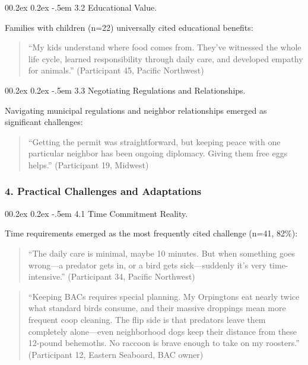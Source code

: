 \documentclass[
  man,
  floatsintext,
  longtable,
  nolmodern,
  notxfonts,
  notimes,
  colorlinks=true,linkcolor=blue,citecolor=blue,urlcolor=blue]{apa7}
\makeatletter
\renewcommand{\paragraph}{\@startsection{paragraph}{4}{\parindent}%
	{0\baselineskip \@plus 0.2ex \@minus 0.2ex}%
	{-.5em}%
	{\normalfont\normalsize\bfseries\typesectitle}}
\makeatother
\begin{document}
\paragraph{3.2 Educational Value.}\label{educational-value}

Families with children (n=22) universally cited educational benefits:

\begin{quote}
``My kids understand where food comes from. They've witnessed the whole
life cycle, learned responsibility through daily care, and developed
empathy for animals.'' (Participant 45, Pacific Northwest)
\end{quote}

\paragraph{3.3 Negotiating Regulations and
Relationships.}\label{negotiating-regulations-and-relationships}

Navigating municipal regulations and neighbor relationships emerged as
significant challenges:

\begin{quote}
``Getting the permit was straightforward, but keeping peace with one
particular neighbor has been ongoing diplomacy. Giving them free eggs
helps.'' (Participant 19, Midwest)
\end{quote}

\subsubsection{4. Practical Challenges and
Adaptations}\label{practical-challenges-and-adaptations}

\paragraph{4.1 Time Commitment Reality.}\label{time-commitment-reality}

Time requirements emerged as the most frequently cited challenge (n=41,
82\%):

\begin{quote}
``The daily care is minimal, maybe 10 minutes. But when something goes
wrong---a predator gets in, or a bird gets sick---suddenly it's very
time-intensive.'' (Participant 34, Pacific Northwest)
\end{quote}

\begin{quote}
``Keeping BACs requires special planning. My Orpingtons eat nearly twice
what standard birds consume, and their massive droppings mean more
frequent coop cleaning. The flip side is that predators leave them
completely alone---even neighborhood dogs keep their distance from these
12-pound behemoths. No raccoon is brave enough to take on my roosters.''
(Participant 12, Eastern Seaboard, BAC owner)
\end{quote}
\end{document}
